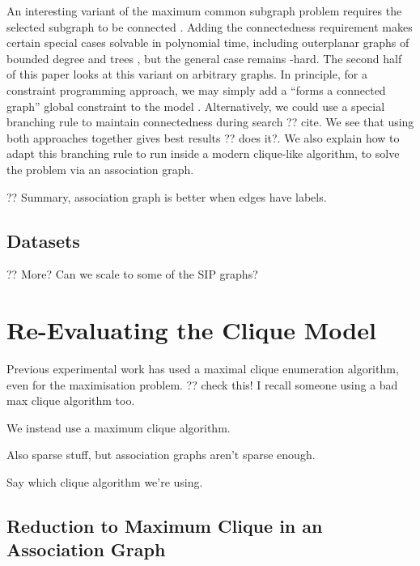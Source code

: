 \documentclass{llncs}
\begin{document}
An interesting variant of the maximum common subgraph problem requires the selected subgraph to be
connected
\cite{DBLP:journals/tcs/Koch01,DBLP:journals/jcamd/RaymondW02a,DBLP:conf/mco/VismaraV08,Ehrlich:2011}.
Adding the connectedness requirement makes certain special cases solvable in polynomial time,
including outerplanar graphs of bounded degree \cite{DBLP:journals/algorithms/AkutsuT13} and trees
\cite{DBLP:journals/corr/DroschinskyKM16}, but the general case remains \NP-hard. The second half of
this paper looks at this variant on arbitrary graphs. In principle, for a constraint programming
approach, we may simply add a ``forms a connected graph'' global constraint to the model
\cite{Brown:2005,DBLP:conf/cp/DoomsDD05,DBLP:conf/cp/QuesadaRD05}. Alternatively, we could use a
special branching rule to maintain connectedness during search ?? cite. We see that using both
approaches together gives best results ?? does it?.  We also explain how to adapt this branching
rule to run inside a modern clique-like algorithm, to solve the problem via an association graph.

?? Summary, association graph is better when edges have labels.

\subsection{Datasets}

\cite{DBLP:journals/prl/SantoFSV03,DBLP:journals/jgaa/ConteFV07}

?? More? Can we scale to some of the SIP graphs?

\section{Re-Evaluating the Clique Model}

Previous experimental work has used a maximal clique enumeration algorithm, even for the
maximisation problem. ?? check this! I recall someone using a bad max clique algorithm too.
\cite{DBLP:conf/sspr/BunkeFGSV02,DBLP:journals/jgaa/ConteFV07}

We instead use a maximum clique algorithm.

Also sparse stuff, but association graphs aren't sparse enough.

Say which clique algorithm we're using.

\subsection{Reduction to Maximum Clique in an Association Graph}
\end{document}
